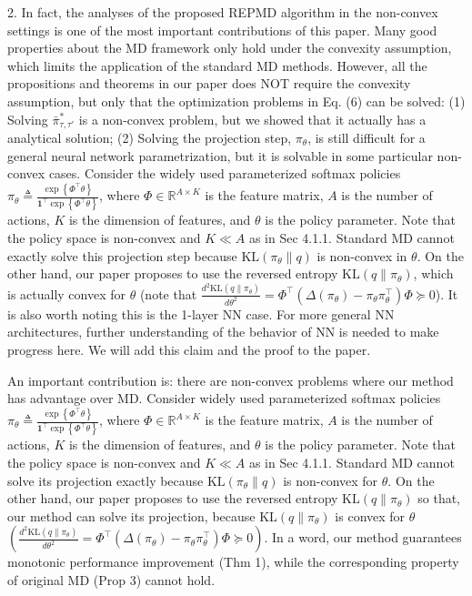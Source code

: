 \documentclass{article}
\begin{document}
2. In fact, the analyses of the proposed REPMD algorithm in the non-convex settings is one of the most important contributions of this paper. Many good properties about the MD framework only hold under the convexity assumption, which limits the application of the standard MD methods. However, all the propositions and theorems in our paper does NOT require the convexity assumption, but only that the optimization problems in Eq. (6) can be solved: (1) Solving $\bar{\pi}^*_{\tau, \tau'}$ is a non-convex problem, but we showed that it actually has a analytical solution; (2) Solving the projection step, $\pi_\theta$, is still difficult for a general neural network parametrization, but it is solvable in some particular non-convex cases. Consider the widely used parameterized softmax policies $\pi_{\theta} \triangleq \frac{\exp\left\{\Phi^\top\theta\right\}}{{\mathbf{1}^\top \exp\left\{\Phi^\top\theta\right\} }}$, where $\Phi\in \mathbb{R}^{A\times K}$ is the feature matrix, $A$ is the number of actions, $K$ is the dimension of features, and $\theta$ is the policy parameter. Note that the policy space is non-convex and $K\ll A$ as in Sec 4.1.1. Standard MD cannot exactly solve this projection step because $\text{KL}(\pi_{\theta} \| q)$ is non-convex in $\theta$. On the other hand, our paper proposes to use the reversed entropy $\text{KL}(q \| \pi_{\theta})$, which is actually convex for $\theta$ (note that $\frac{d^2 \text{KL}(q \| \pi_{\theta})}{d \theta^2} = \Phi^\top (\Delta(\pi_\theta) - \pi_\theta \pi_\theta^\top) \Phi \succeq 0$). It is also worth noting this is the 1-layer NN case. For more general NN architectures, further understanding of the behavior of NN is needed to make progress here. We will add this claim and the proof to the paper.

An important contribution is: there are non-convex problems where our method has advantage over MD. Consider widely used parameterized softmax policies $\pi_{\theta} \triangleq \frac{\exp\left\{\Phi^\top\theta\right\}}{{\mathbf{1}^\top \exp\left\{\Phi^\top\theta\right\} }}$, where $\Phi\in \mathbb{R}^{A\times K}$ is the feature matrix, $A$ is the number of actions, $K$ is the dimension of features, and $\theta$ is the policy parameter. Note that the policy space is non-convex and $K\ll A$ as in Sec 4.1.1. Standard MD cannot solve its projection exactly because $\text{KL}(\pi_{\theta} \| q)$ is non-convex for $\theta$. On the other hand, our paper proposes to use the reversed entropy $\text{KL}(q \| \pi_{\theta})$ so that,  our method can solve its projection, because $\text{KL}(q \| \pi_{\theta})$ is convex for $\theta$ $(\frac{d^2 \text{KL}(q \| \pi_{\theta})}{d \theta^2} = \Phi^\top (\Delta(\pi_\theta) - \pi_\theta \pi_\theta^\top) \Phi \succeq 0)$. In a word, our method guarantees monotonic performance improvement (Thm 1), while the corresponding property of original MD (Prop 3) cannot hold.
\fi 
\end{document}
